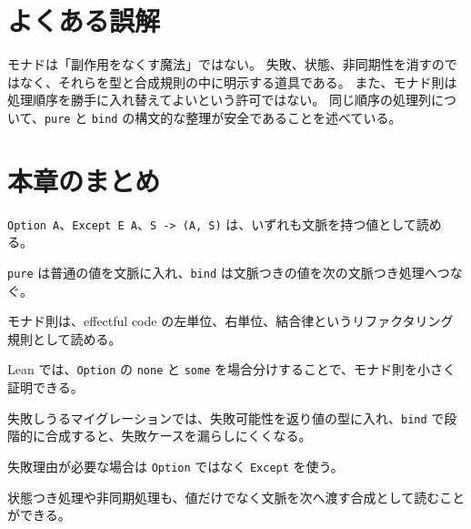 \section{よくある誤解}

\begin{warningbox}
モナドは「副作用をなくす魔法」ではない。
失敗、状態、非同期性を消すのではなく、それらを型と合成規則の中に明示する道具である。
また、モナド則は処理順序を勝手に入れ替えてよいという許可ではない。
同じ順序の処理列について、\texttt{pure} と \texttt{bind} の構文的な整理が安全であることを述べている。
\end{warningbox}

\section{本章のまとめ}

\texttt{Option A}、\texttt{Except E A}、\texttt{S -> (A, S)} は、いずれも文脈を持つ値として読める。

\texttt{pure} は普通の値を文脈に入れ、\texttt{bind} は文脈つきの値を次の文脈つき処理へつなぐ。

モナド則は、effectful code の左単位、右単位、結合律というリファクタリング規則として読める。

Lean では、\texttt{Option} の \texttt{none} と \texttt{some} を場合分けすることで、モナド則を小さく証明できる。

失敗しうるマイグレーションでは、失敗可能性を返り値の型に入れ、\texttt{bind} で段階的に合成すると、失敗ケースを漏らしにくくなる。

失敗理由が必要な場合は \texttt{Option} ではなく \texttt{Except} を使う。

状態つき処理や非同期処理も、値だけでなく文脈を次へ渡す合成として読むことができる。
